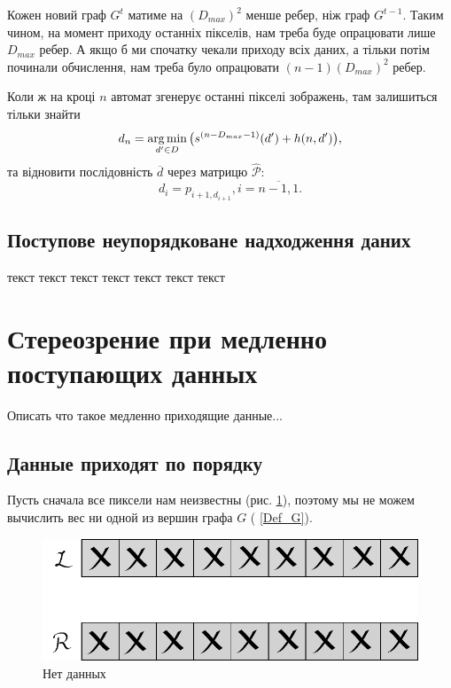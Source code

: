 Кожен новий граф $G^t$ матиме на $(D_{max})^2$ менше ребер, ніж граф $G^{t-1}$. Таким чином, на момент приходу останніх пікселів, нам треба буде опрацювати лише $D_{max}$ ребер. А якщо б ми спочатку чекали приходу всіх даних, а тільки потім починали обчислення, нам треба було опрацювати 
$(n-1)(D_{max})^2$ ребер.

Коли ж на кроці $ n $ автомат згенерує останні пікселі зображень, там залишиться тільки знайти
$$ d_n = \operatorname*{arg\,min}\limits_{d' \in D} \big( s^{(n-D_{max}-1)}(d') + h(n, d') \big),$$
та відновити послідовність $\overline{d}$ через матрицю $\hat{\mathcal{P}}$:
$$ d_i = p_{i+1,d_{i+1}}, i = \overline{n-1, 1}. $$



\subsection{Поступове неупорядковане надходження даних}
текст текст текст текст текст текст текст 









\section{Стереозрение при медленно поступающих данных}
Описать что такое медленно приходящие данные...

\subsection{Данные приходят по порядку}
Пусть сначала все пиксели нам неизвестны (рис. \ref{1.4_im_nodata}), поэтому мы не можем вычислить вес ни одной из вершин графа $G$ ( \ref{Def_G}).
\begin{figure}[h!]
	\centering
	\includegraphics[scale = 0.7]{allclosed2.pdf}
	\caption{Нет данных}
	\label{1.4_im_nodata}
\end{figure}

